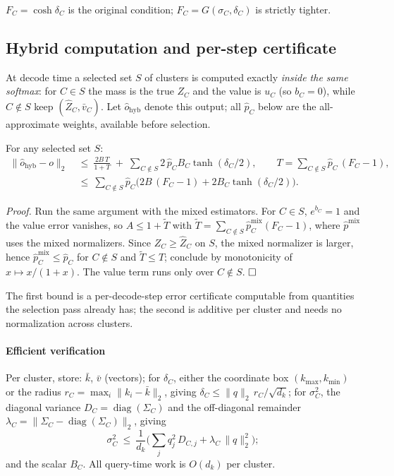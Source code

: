 $F_C = \cosh\delta_C$ is the original condition; $F_C = G(\sigma_C,\delta_C)$ is
strictly tighter.

\subsection{Hybrid computation and per-step certificate}

At decode time a selected set $S$ of clusters is computed exactly \emph{inside the
same softmax}: for $C \in S$ the mass is the true $Z_C$ and the value is $u_C$ (so
$b_C = 0$), while $C \notin S$ keep $(\hat Z_C, \bar v_C)$. Let
$\hat o_{\mathrm{hyb}}$ denote this output; all $\hat p_C$ below are the
all-approximate weights, available before selection.

\begin{tcolorbox}[colback=white, colframe=black, arc=0mm, boxrule=0.5pt]
For any selected set $S$:
\begin{align*}
\|\hat o_{\mathrm{hyb}} - o\|_2
&\ \le\ \frac{2B\,T}{1+T}
 \;+\; \sum_{C\notin S} 2\,\hat p_C B_C \tanh(\delta_C/2),
\qquad T = \sum_{C \notin S} \hat p_C\, (F_C - 1),
\\[4pt]
&\ \le\ \sum_{C \notin S} \hat p_C
   \Big( 2B\,(F_C - 1) + 2 B_C \tanh(\delta_C/2) \Big).
\end{align*}
\end{tcolorbox}

\emph{Proof.} Run the same argument with the mixed estimators. For $C \in S$,
$e^{b_C} = 1$ and the value error vanishes, so $A \le 1 + \tilde T$ with
$\tilde T = \sum_{C\notin S} \hat p^{\mathrm{mix}}_C (F_C - 1)$, where
$\hat p^{\mathrm{mix}}$ uses the mixed normalizers. Since $Z_C \ge \hat Z_C$ on $S$,
the mixed normalizer is larger, hence $\hat p^{\mathrm{mix}}_C \le \hat p_C$ for
$C \notin S$ and $\tilde T \le T$; conclude by monotonicity of $x \mapsto x/(1+x)$.
The value term runs only over $C \notin S$. $\hfill\square$

The first bound is a per-decode-step error certificate computable from quantities the
selection pass already has; the second is additive per cluster and needs no
normalization across clusters.

\paragraph{Efficient verification}
Per cluster, store: $\bar k$, $\bar v$ (vectors); for $\delta_C$, either the coordinate
box $(k_{\max}, k_{\min})$ or the radius $r_C = \max_{i}\|k_i - \bar k\|_2$, giving
$\delta_C \le \|q\|_2\, r_C / \sqrt{d_k}$; for $\sigma_C^2$, the diagonal variance
$D_C = \operatorname{diag}(\Sigma_C)$ and the off-diagonal remainder
$\lambda_C = \|\Sigma_C - \operatorname{diag}(\Sigma_C)\|_2$, giving
\[
\sigma_C^2 \ \le\
\frac{1}{d_k}\Big( \sum_j q_j^2\, D_{C,j} + \lambda_C\, \|q\|_2^2 \Big);
\]
and the scalar $B_C$. All query-time work is $O(d_k)$ per cluster.
